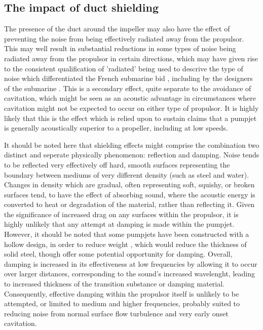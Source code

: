 \documentclass{article}\usepackage[]{graphicx}\usepackage[]{color}
\begin{document}
\subsection{The impact of duct shielding}
The presence of the duct around the impeller may also have the effect of preventing the noise from being effectively radiated away from the propulsor.  This may well result in substantial reductions in some types of noise being radiated away from the propulsor in certain directions, which may have given rise to the consistent qualification of 'radiated' being used to descrive the type of noise which differentiated the French submarine bid \parencite{stewart2016} \parencite{davies2017} \parencite{ohff2016}, including by the designers of the submarine \parencite{autret2016}.  This is a secondary effect, quite separate to the avoidance of cavitation, which might be seen as an acoustic advantage in circumstances where cavitation might not be expected to occur on either type of propulsor.  It is highly likely that this is the effect which is relied upon to sustain claims that a pumpjet is generally acoustically superior to a propeller, including at low speeds.

It should be noted here that shielding effects might comprise the combination two distinct and seperate physically phenomenon: reflection and damping.  Noise tends to be reflected very effectively off hard, smooth surfaces representing the boundary between mediums of very different density (such as steel and water).  Changes in density which are gradual, often representing soft, squishy, or broken surfaces tend, to have the effect of absorbing sound, where the acoustic energy is converted to heat or degradation of the material, rather than reflecting it.  Given the significance of increased drag on any surfaces within the propulsor, it is highly unlikely that any attempt at damping is made within the pumpjet.  However, it should be noted that some pumpjets have been constructed with a hollow design, in order to reduce weight \parencite{harvie1965construction}, which would reduce the thickness of solid steel, though offer some potential opportunity for damping.  Overall, damping is increased in its effectiveness at low frequencies by allowing it to occur over larger distances, corresponding to the sound's increased wavelenght, leading to increased thickness of the transition substance or damping material.  Consequently, effective damping within the propulsor itself is unlikely to be attempted, or limited to medium and higher frequencies, probably suited to reducing noise from normal surface flow turbulence and very early onset cavitation.
\end{document}
